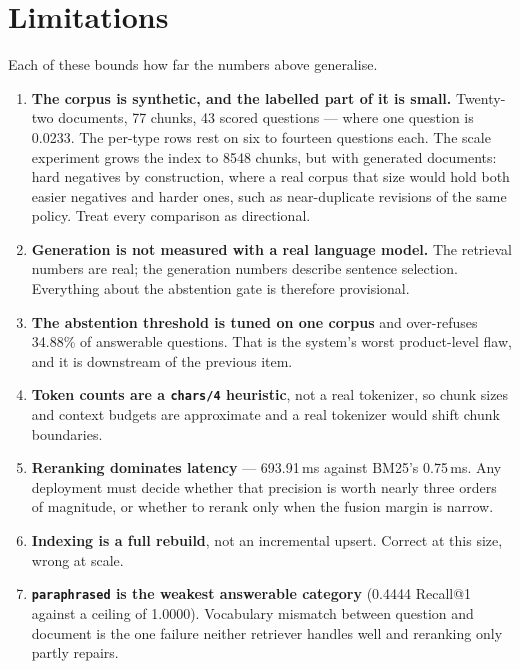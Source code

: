 \documentclass[11pt,a4paper]{article}
\newcommand{\code}[1]{\texttt{\small #1}}
\begin{document}
\section{Limitations}

Each of these bounds how far the numbers above generalise.

\begin{enumerate}[leftmargin=1.4em,itemsep=3pt]
  \item \textbf{The corpus is synthetic, and the labelled part of it is small.}
        Twenty-two documents, 77 chunks, 43 scored questions --- where one
        question is 0.0233. The per-type rows rest on six to fourteen questions
        each. The scale experiment grows the index to 8548 chunks, but with
        generated documents: hard negatives by construction, where a real corpus
        that size would hold both easier negatives and harder ones, such as
        near-duplicate revisions of the same policy. Treat every comparison as
        directional.
  \item \textbf{Generation is not measured with a real language model.} The
        retrieval numbers are real; the generation numbers describe sentence
        selection. Everything about the abstention gate is therefore provisional.
  \item \textbf{The abstention threshold is tuned on one corpus} and over-refuses
        34.88\% of answerable questions. That is the system's worst
        product-level flaw, and it is downstream of the previous item.
  \item \textbf{Token counts are a \code{chars/4} heuristic}, not a real
        tokenizer, so chunk sizes and context budgets are approximate and a real
        tokenizer would shift chunk boundaries.
  \item \textbf{Reranking dominates latency} --- 693.91\,ms against BM25's
        0.75\,ms. Any deployment must decide whether that precision is worth
        nearly three orders of magnitude, or whether to rerank only when the
        fusion margin is narrow.
  \item \textbf{Indexing is a full rebuild}, not an incremental upsert. Correct
        at this size, wrong at scale.
  \item \textbf{\code{paraphrased} is the weakest answerable category} (0.4444
        Recall@1 against a ceiling of 1.0000). Vocabulary mismatch between
        question and document is the one failure neither retriever handles well
        and reranking only partly repairs.
\end{enumerate}
\end{document}
